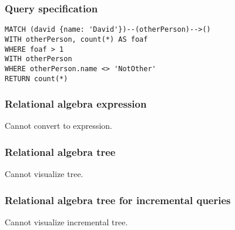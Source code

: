 \subsubsection*{Query specification}

\begin{lstlisting}
MATCH (david {name: 'David'})--(otherPerson)-->()
WITH otherPerson, count(*) AS foaf
WHERE foaf > 1
WITH otherPerson
WHERE otherPerson.name <> 'NotOther'
RETURN count(*)
\end{lstlisting}

\subsubsection*{Relational algebra expression}

Cannot convert to expression.

\subsubsection*{Relational algebra tree}

Cannot visualize tree.

\subsubsection*{Relational algebra tree for incremental queries}

Cannot visualize incremental tree.

